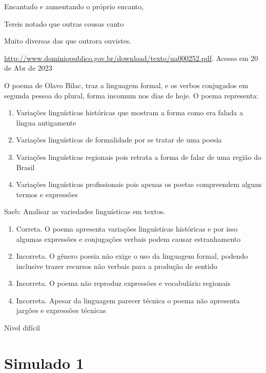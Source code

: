 {Encantado e aumentando o próprio encanto,

Tereis notado que outras cousas canto

Muito diversas das que outrora ouvistes.

\href{http://www.dominiopublico.gov.br/download/texto/ua000252.pdf}{\uline{http://www.dominiopublico.gov.br/download/texto/ua000252.pdf}}.
Acesso em 20 de Abr de 2023

O poema de Olavo Bilac, traz a linguagem formal, e os verbos conjugados
em segunda pessoa do plural, forma incomum nos dias de hoje. O poema
representa:

\begin{enumerate}
\def\labelenumi{\alph{enumi})}
\item
  Variações linguísticas históricas que mostram a forma como era falada
  a língua antigamente
\item
  Variações linguísticas de formalidade por se tratar de uma poesia
\item
  Variações linguísticas regionais pois retrata a forma de falar de uma
  região do Brasil
\item
  Variações linguísticas profissionais pois apenas os poetas compreendem
  alguns termos e expressões
\end{enumerate}

Saeb: Analisar as variedades linguísticas em textos.

\begin{enumerate}
\def\labelenumi{\arabic{enumi}.}
\item
  Correta. O poema apresenta variações linguísticas históricas e por
  isso algumas expressões e conjugações verbais podem causar
  estranhamento
\item
  Incorreta. O gênero poesia não exige o uso da linguagem formal,
  podendo inclusive trazer recursos não verbais para a produção de
  sentido
\item
  Incorreta. O poema não reproduz expressões e vocabulário regionais
\item
  Incorreta. Apesar da linguagem parecer técnica o poema não apresenta
  jargões e expressões técnicas
\end{enumerate}

Nível difícil

\chapter{Simulado 1}

}
